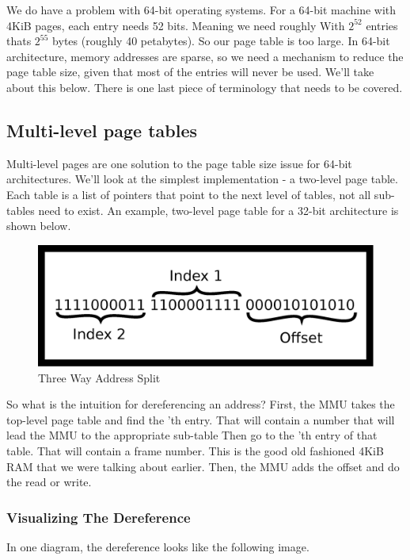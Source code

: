 We do have a problem with 64-bit operating systems.
For a 64-bit machine with 4KiB pages, each entry needs 52 bits.
Meaning we need roughly
With $2^{52}$ entries thats $2^{55}$ bytes (roughly 40 petabytes).
So our page table is too large.
In 64-bit architecture, memory addresses are sparse, so we need a mechanism to reduce the page table size, given that most of the entries will never be used.
We'll take about this below. There is one last piece of terminology that needs to be covered.

\subsection{Multi-level page tables}

Multi-level pages are one solution to the page table size issue for 64-bit architectures.
We'll look at the simplest implementation - a two-level page table.
Each table is a list of pointers that point to the next level of tables, not all sub-tables need to exist.
An example, two-level page table for a 32-bit architecture is shown below.

\begin{figure}[H]
\centering
\includegraphics[width=.5\textwidth]{ipc/drawings/three_address_split.eps}
\caption{Three Way Address Split}
\end{figure}

So what is the intuition for dereferencing an address?
First, the MMU takes the top-level page table and find the 'th entry.
That will contain a number that will lead the MMU to the appropriate sub-table
Then go to the 'th entry of that table.
That will contain a frame number.
This is the good old fashioned 4KiB RAM that we were talking about earlier.
Then, the MMU adds the offset and do the read or write.

\subsubsection{Visualizing The Dereference}

In one diagram, the dereference looks like the following image.

